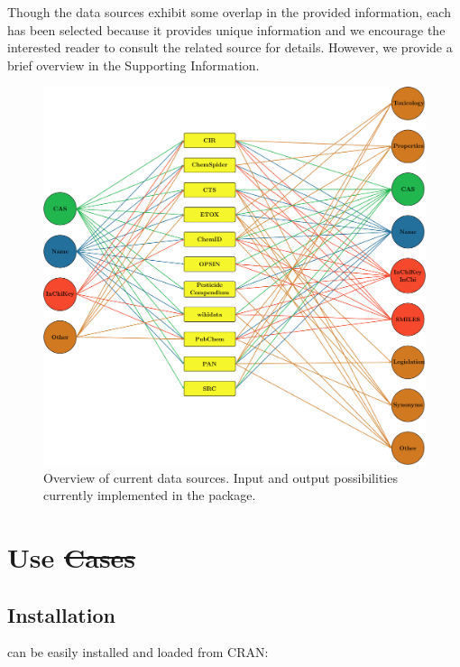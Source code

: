 \documentclass[article, shortnames]{jss}\usepackage[]{graphicx}\usepackage[]{color}
\providecommand{\DIFadd}[1]{{\protect\color{blue}\uwave{#1}}} %
\providecommand{\DIFdel}[1]{{\protect\color{red}\sout{#1}}}                      %
\providecommand{\DIFaddbegin}{} %
\providecommand{\DIFaddend}{} %
\providecommand{\DIFdelbegin}{} %
\providecommand{\DIFdelend}{} %
\providecommand{\DIFaddbeginFL}{} %
\providecommand{\DIFaddendFL}{} %
\providecommand{\DIFdelbeginFL}{} %
\providecommand{\DIFdelendFL}{} %
\begin{document}
Though the data sources exhibit some overlap in the provided information, each has been selected because it provides unique information and we encourage the interested reader to consult the related source for details. 
However, we provide a brief overview in the Supporting Information.

\begin{figure}[ht]
  \centering
  \DIFdelbeginFL %
\DIFdelendFL \DIFaddbeginFL \includegraphics{fig1}
  \DIFaddendFL \caption{Overview of current data sources. Input and output possibilities currently implemented in the package.}
  \label{fig:fig1}
\end{figure}


\DIFdelbegin %
\DIFdelend \DIFaddbegin \section[Use cases]{\DIFaddend Use \DIFdelbegin \DIFdel{Cases}\DIFdelend \DIFaddbegin \DIFadd{cases}\DIFaddend }
\subsection[Install webchem]{Installation}
 can be easily installed and loaded from CRAN:
\end{document}
